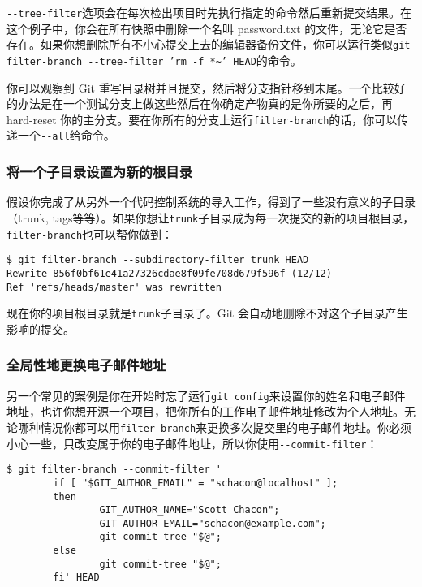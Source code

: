 \documentclass[a4paper]{book}
\begin{document}
\texttt{-{}-tree-filter}选项会在每次检出项目时先执行指定的命令然后重新提交结果。在这个例子中，你会在所有快照中删除一个名叫 password.txt 的文件，无论它是否存在。如果你想删除所有不小心提交上去的编辑器备份文件，你可以运行类似\texttt{git filter-branch -{}-tree-filter 'rm -f *\textasciitilde{}' HEAD}的命令。

你可以观察到 Git 重写目录树并且提交，然后将分支指针移到末尾。一个比较好的办法是在一个测试分支上做这些然后在你确定产物真的是你所要的之后，再 hard-reset 你的主分支。要在你所有的分支上运行\texttt{filter-branch}的话，你可以传递一个\texttt{-{}-all}给命令。

\subsubsection{将一个子目录设置为新的根目录}

假设你完成了从另外一个代码控制系统的导入工作，得到了一些没有意义的子目录（trunk, tags等等）。如果你想让\texttt{trunk}子目录成为每一次提交的新的项目根目录，\texttt{filter-branch}也可以帮你做到：

\begin{shaded}\begin{verbatim}
$ git filter-branch --subdirectory-filter trunk HEAD
Rewrite 856f0bf61e41a27326cdae8f09fe708d679f596f (12/12)
Ref 'refs/heads/master' was rewritten
\end{verbatim}\end{shaded}

现在你的项目根目录就是\texttt{trunk}子目录了。Git 会自动地删除不对这个子目录产生影响的提交。

\subsubsection{全局性地更换电子邮件地址}

另一个常见的案例是你在开始时忘了运行\texttt{git config}来设置你的姓名和电子邮件地址，也许你想开源一个项目，把你所有的工作电子邮件地址修改为个人地址。无论哪种情况你都可以用\texttt{filter-branch}来更换多次提交里的电子邮件地址。你必须小心一些，只改变属于你的电子邮件地址，所以你使用\texttt{-{}-commit-filter}：

\begin{shaded}\begin{verbatim}
$ git filter-branch --commit-filter '
        if [ "$GIT_AUTHOR_EMAIL" = "schacon@localhost" ];
        then
                GIT_AUTHOR_NAME="Scott Chacon";
                GIT_AUTHOR_EMAIL="schacon@example.com";
                git commit-tree "$@";
        else
                git commit-tree "$@";
        fi' HEAD
\end{verbatim}\end{shaded}
\end{document}

